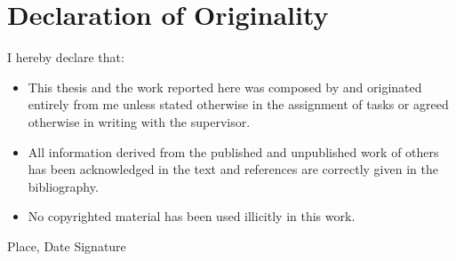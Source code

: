 \chapter*{Declaration of Originality}
I hereby declare that:
\begin{itemize}
\item This thesis and the work reported here was composed by and originated entirely from me unless stated otherwise in the assignment of tasks or agreed otherwise in writing with the supervisor.
\item All information derived from the published and unpublished work of others has been acknowledged in the text and references are correctly given in the bibliography. 
\item No copyrighted material has been used illicitly in this work.
\newline
\end{itemize} 
Place, Date \hfill Signature